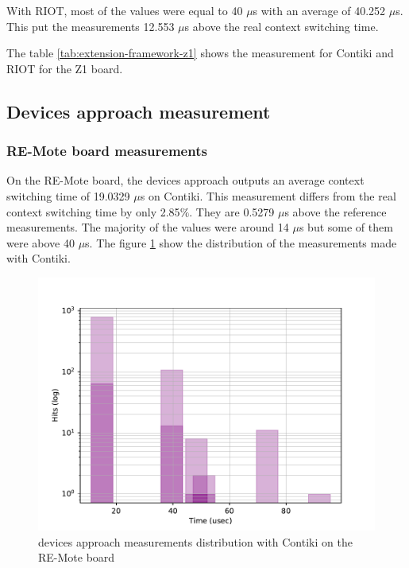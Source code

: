 With RIOT, most of the values were equal to 40 $\mu$s with an average of 40.252 $\mu$s.
This put the measurements 12.553 $\mu$s above the real context switching time.

The table \ref{tab:extension-framework-z1} shows the measurement for Contiki and RIOT for the Z1 board.



\subsection{Devices approach measurement}

\subsubsection{RE-Mote board measurements}
On the RE-Mote board, the devices approach outputs an average context switching time of 19.0329 $\mu$s on Contiki.
This measurement differs from the real context switching time by only 2.85$\%$.
They are 0.5279 $\mu$s above the reference measurements.
The majority of the values were around 14 $\mu$s but some of them were above 40 $\mu$s.
The figure \ref{fig:devices-framework-contiki-remote} show the distribution of the measurements made with Contiki.

\begin{figure}[!ht]
      \centering
      \includegraphics[scale=.7]{assets/devices-framework-contiki-remote.pdf}
      \caption{devices approach measurements distribution with Contiki on the RE-Mote board\label{fig:devices-framework-contiki-remote}}
\end{figure}


